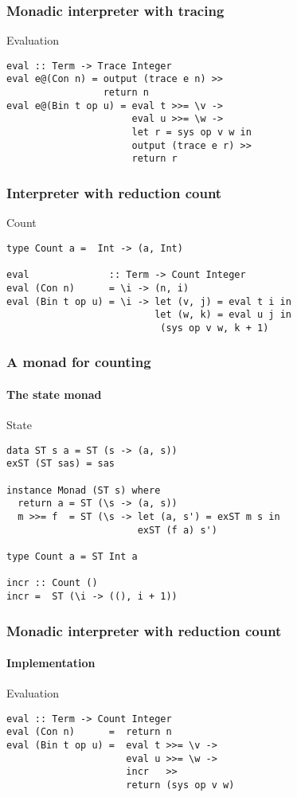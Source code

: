 \documentclass{beamer}
\begin{document}
\begin{frame}[fragile]
 \frametitle{Monadic interpreter with tracing}
 \begin{exampleblock}{Evaluation}
\begin{verbatim}
eval :: Term -> Trace Integer
eval e@(Con n) = output (trace e n) >>
                 return n
eval e@(Bin t op u) = eval t >>= \v ->
                      eval u >>= \w ->
                      let r = sys op v w in
                      output (trace e r) >>
                      return r
\end{verbatim}
\end{exampleblock}      
\end{frame}             

\begin{frame}[fragile]
  \frametitle{Interpreter with reduction count}\small
  \begin{block}{Count}
\begin{verbatim}
type Count a =  Int -> (a, Int)

eval              :: Term -> Count Integer
eval (Con n)      = \i -> (n, i)
eval (Bin t op u) = \i -> let (v, j) = eval t i in    
                          let (w, k) = eval u j in
                           (sys op v w, k + 1)
\end{verbatim} 
\end{block}
\end{frame}            


\begin{frame}[fragile]
  \frametitle{A monad for counting}
  \framesubtitle{The state monad}
  \begin{alertblock}{State}
\begin{verbatim}
data ST s a = ST (s -> (a, s))
exST (ST sas) = sas

instance Monad (ST s) where
  return a = ST (\s -> (a, s))
  m >>= f  = ST (\s -> let (a, s') = exST m s in
                       exST (f a) s')

type Count a = ST Int a

incr :: Count ()
incr =  ST (\i -> ((), i + 1))
\end{verbatim} 
\end{alertblock}
\end{frame}

\begin{frame}[fragile]
  \frametitle{Monadic interpreter with reduction count}
  \framesubtitle{Implementation}
\begin{exampleblock}{Evaluation}
\begin{verbatim}
eval :: Term -> Count Integer
eval (Con n)      =  return n
eval (Bin t op u) =  eval t >>= \v ->
                     eval u >>= \w ->
                     incr   >>
                     return (sys op v w)
\end{verbatim} 
\end{exampleblock}
\end{frame}            
\end{document}
